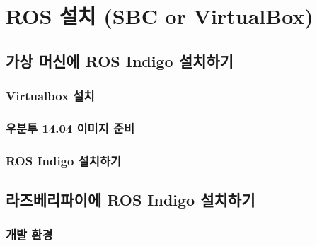 
\chapter{ROS 설치 (SBC or VirtualBox)}

\section{가상 머신에 ROS Indigo 설치하기}

\subsection{Virtualbox 설치}

\subsection{우분투 14.04 이미지 준비}

\subsection{ROS Indigo 설치하기}

\section{라즈베리파이에 ROS Indigo 설치하기}

\subsection{개발 환경}

